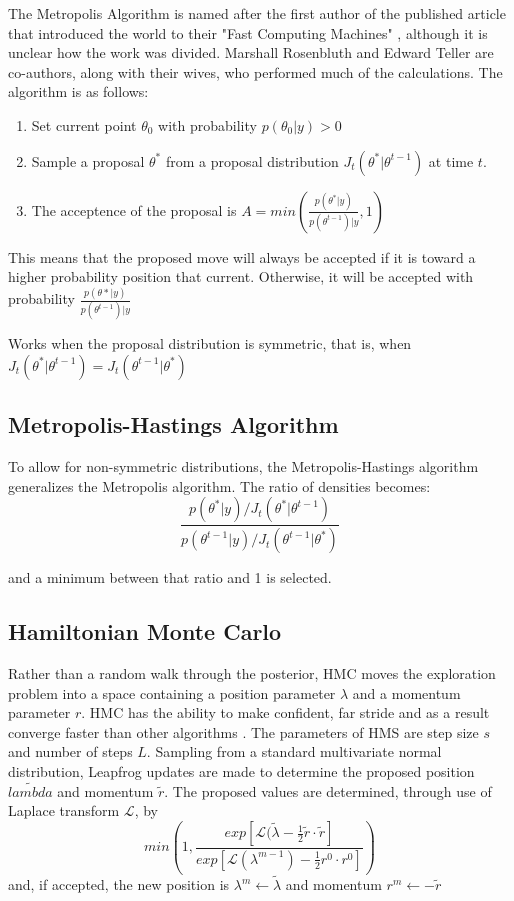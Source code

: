 The Metropolis Algorithm is named after the first author of the published article that introduced the world to their "Fast Computing Machines" \cite{metropolis1953equation}, although it is unclear how the work was divided. Marshall Rosenbluth and Edward Teller are co-authors, along with their wives, who performed much of the calculations.  The algorithm is as follows:

\begin{enumerate}
\tightlist
\item{Set current point $\theta_0$ with probability $p(\theta_0|y) > 0$}

\item{Sample a proposal $\theta^*$ from a proposal distribution $J_t(\theta^* | \theta^{t-1})$ at time $t$.}

\item{The acceptence of the proposal is $A = min \left( \frac{p(\theta^*|y)}{p(\theta^{t-1})|y} , 1 \right) $}
\end{enumerate}

This means that the proposed move will always be accepted if it is toward a higher probability position that current.  Otherwise, it will be accepted with probability $\frac{p(\theta*|y)}{p(\theta^{t-1})|y}$

Works when the proposal distribution is symmetric, that is, when $J_t(\theta^* | \theta^{t-1}) = J_t(\theta^{t-1} | \theta^*)$

\subsection{Metropolis-Hastings Algorithm}

To allow for non-symmetric distributions, the Metropolis-Hastings algorithm generalizes the Metropolis algorithm.  The ratio of densities becomes:
$$
\frac{ p(\theta^*|y) / J_t(\theta^* | \theta^{t-1}) }{ p(\theta^{t-1}|y) / J_t(\theta^{t-1} | \theta^*) }
$$

and a minimum between that ratio and 1 is selected.

\subsection{Hamiltonian Monte Carlo}

Rather than a random walk through the posterior, HMC moves the exploration problem into a space containing a position parameter $\lambda$ and a momentum parameter $r$.  HMC has the ability to make confident, far stride and as a result converge faster than other algorithms \cite{mullachery2018bayesian}.
The parameters of HMS are step size $s$ and number of steps $L$. Sampling from a standard multivariate normal distribution, Leapfrog updates are made to determine the proposed position $\tilde{lambda}$ and momentum $\tilde{r}$.  The proposed values are determined, through use of Laplace transform $\mathcal{L}$, by
$$
min\left( 1, \frac{exp[\mathcal{L}(\tilde{\lambda} - \frac{1}{2} \tilde{r} \cdot \tilde{r}]}
{exp[\mathcal{L}(\lambda^{m-1}) - \frac{1}{2} r^0 \cdot r^0] }
\right)
$$
and, if accepted, the new position is $\lambda^m \leftarrow \tilde{\lambda}$ and momentum $r^m \leftarrow -\tilde{r}$

